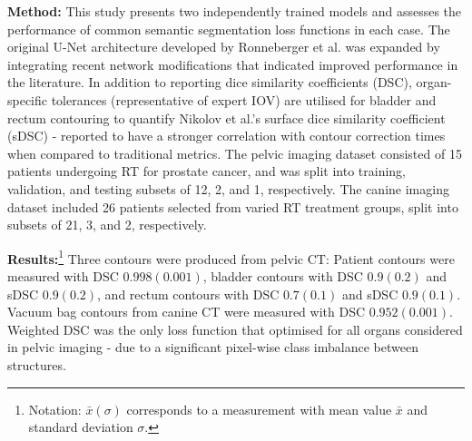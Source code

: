 \textbf{Method:}
This study presents two independently trained models and assesses the
performance of common semantic segmentation loss functions in each case. The
original U-Net architecture developed by Ronneberger et al. was expanded by
integrating recent network modifications that indicated improved performance in
the literature. In addition to reporting dice similarity coefficients (DSC),
organ-specific tolerances (representative of expert IOV) are utilised for
bladder and rectum contouring to quantify Nikolov et al.'s surface dice
similarity coefficient (sDSC) - reported to have a stronger correlation with
contour correction times when compared to traditional metrics. The pelvic
imaging dataset consisted of 15 patients undergoing RT for prostate cancer, and
was split into training, validation, and testing subsets of 12, 2, and 1,
respectively. The canine imaging dataset included 26 patients selected from
varied RT treatment groups, split into subsets of 21, 3, and 2, respectively.

\textbf{Results:}\footnote{Notation: $\bar{x}(\sigma)$ corresponds to a
measurement with mean value $\bar{x}$ and standard deviation $\sigma$.} Three
contours were produced from pelvic CT: Patient contours were measured with DSC
$0.998(0.001)$, bladder contours with DSC $0.9(0.2)$ and sDSC $0.9(0.2)$, and
rectum contours with DSC $0.7(0.1)$ and sDSC $0.9(0.1)$. Vacuum bag contours
from canine CT were measured with DSC $0.952(0.001)$. Weighted DSC was the only
loss function that optimised for all organs considered in pelvic imaging -
due to a significant pixel-wise class imbalance between structures.

